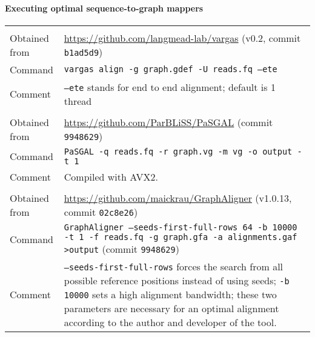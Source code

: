 \paragraph{Executing optimal sequence-to-graph mappers}
\begin{tabular}{lp{9.5cm}}
	\textbf{\vargas} & \\
	\quad Obtained from & \url{https://github.com/langmead-lab/vargas} (v0.2, commit \texttt{b1ad5d9}) \\
	\quad Command & \texttt{vargas align -g graph.gdef -U reads.fq --ete} \\
	\quad Comment & \texttt{--ete} stands for end to end alignment; default is 1 thread \\
	\textbf{\pasgal} & \\
	\quad Obtained from & \url{https://github.com/ParBLiSS/PaSGAL} (commit \texttt{9948629}) \\	
	\quad Command & \texttt{PaSGAL -q reads.fq -r graph.vg -m vg -o output -t 1} \\
	\quad Comment & Compiled with AVX2.\\
	\textbf{\graphaligner} & \\
	\quad Obtained from &
	\url{https://github.com/maickrau/GraphAligner}
	(v1.0.13, commit \texttt{02c8e26}) \\
	\quad Command & \texttt{GraphAligner --seeds-first-full-rows 64 -b 10000 -t 1 -f reads.fq -g graph.gfa -a alignments.gaf >output} (commit \texttt{9948629})\\
	\quad Comment & \texttt{--seeds-first-full-rows} forces the search from all
	possible reference positions instead of using seeds; \texttt{-b 10000} sets
	a high alignment bandwidth; these two parameters are necessary for an
	optimal alignment according to the author and developer of the tool.\\
\end{tabular}\\

